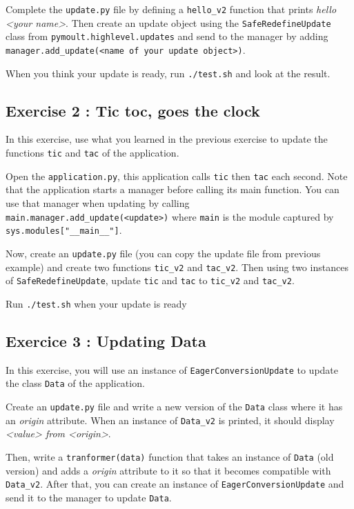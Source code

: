 \documentclass{article}
\begin{document}
Complete the \texttt{update.py} file by defining a
\texttt{hello\_v2} function that prints \textit{hello <your
  name>}. Then create an update object using the
\texttt{SafeRedefineUpdate} class from
\texttt{pymoult.highlevel.updates} and send to the manager by adding
\texttt{manager.add\_update(<name of your update object>)}. 

When you think your update is ready, run \texttt{./test.sh} and look
at the result.


\subsection{Exercise 2 : Tic toc, goes the clock}

In this exercise, use what you learned in the previous exercise to
update the functions \texttt{tic} and \texttt{tac} of the
application.

Open the \texttt{application.py}, this application calls
\texttt{tic} then \texttt{tac} each second. Note that the
application starts a manager before calling its main function. You can
use that manager when updating by calling \\
\texttt{main.manager.add\_update(<update>)} where \texttt{main}
is the module captured by \texttt{sys.modules["\_\_main\_\_"]}.

Now, create an \texttt{update.py} file (you can copy the update file
from previous example) and create two functions \texttt{tic\_v2} and
\texttt{tac\_v2}. Then using two instances of
\texttt{SafeRedefineUpdate}, update \texttt{tic} and
\texttt{tac} to \texttt{tic\_v2} and \texttt{tac\_v2}.

Run \texttt{./test.sh} when your update is ready

\subsection{Exercice 3 : Updating Data}

In this exercise, you will use an instance of
\texttt{EagerConversionUpdate} to update the class \texttt{Data} of
the application.

Create an \texttt{update.py} file and write a new version of the
\texttt{Data} class where it has an \textit{origin} attribute. When an
instance of \texttt{Data\_v2} is printed, it should display
\textit{<value> from <origin>}.

Then, write a \texttt{tranformer(data)} function that takes an
instance of \texttt{Data} (old version) and adds a \textit{origin}
attribute to it so that it becomes compatible with
\texttt{Data\_v2}. After that, you can create an instance of
\texttt{EagerConversionUpdate} and send it to the manager to update
\texttt{Data}.
\end{document}
